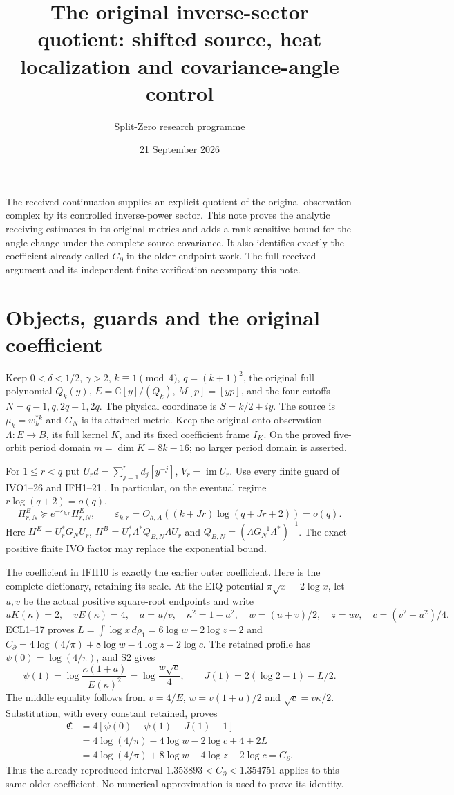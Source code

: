 \documentclass[11pt]{article}
\title{The original inverse-sector quotient: shifted source, heat localization and covariance-angle control}
\author{Split-Zero research programme}\date{21 September 2026}
\begin{document}
\maketitle
The received continuation supplies an explicit quotient of the original
observation complex by its controlled inverse-power sector. This note
proves the analytic receiving estimates in its original metrics and adds
a rank-sensitive bound for the angle change under the complete source
covariance. It also identifies exactly the coefficient already called
$C_\partial$ in the older endpoint work. The full received argument and
its independent finite verification accompany this note.

\section{Objects, guards and the original coefficient}
Keep $0<\delta<1/2$, $\gamma>2$, $k\equiv1\pmod4$,
$q=(k+1)^2$, the original full polynomial $Q_k(y)$,
$E=\mathbb C[y]/(Q_k)$, $M[p]=[yp]$, and the four cutoffs
$N=q-1,q,2q-1,2q$. The physical coordinate is $S=k/2+iy$.
The source is $\mu_k=w_h^{*k}$ and $G_N$ is its attained metric.
Keep the original onto observation $\Lambda:E\to B$, its full kernel
$K$, and its fixed coefficient frame $I_K$. On the proved five-orbit
period domain $m=\dim K=8k-16$; no larger period domain is asserted.

For $1\le r<q$ put $U_rd=\sum_{j=1}^rd_j[y^{-j}]$, $V_r=\operatorname{im}U_r$.
Use every finite guard of IVO1--26 and IFH1--21 \cite{IFH,IVO}.
In particular, on the eventual regime $r\log(q+2)=o(q)$,
\[
H^B_{r,N}\succeq e^{-\varepsilon_{k,r}}H^E_{r,N},\qquad
\varepsilon_{k,r}=O_{h,A}((k+Jr)\log(q+Jr+2))=o(q).
\tag{IQR1}
\]
Here $H^E=U_r^*G_NU_r$, $H^B=U_r^*\Lambda^*Q_{B,N}\Lambda U_r$
and $Q_{B,N}=(\Lambda G_N^{-1}\Lambda^*)^{-1}$.
The exact positive finite IVO factor may replace the exponential bound.

The coefficient in IFH10 is exactly the earlier outer coefficient.
Here is the complete dictionary, retaining its scale.
At the EIQ potential $\pi\sqrt x-2\log x$, let $u,v$ be the actual
positive square-root endpoints and write
\[
uK(\kappa)=2,\quad vE(\kappa)=4,\quad a=u/v,\quad
\kappa^2=1-a^2,\quad w=(u+v)/2,\quad z=uv,\quad c=(v^2-u^2)/4.
\]
ECL1--17 \cite{ECL} proves
$L=\int\log x\,d\rho_1=6\log w-2\log z-2$ and
$C_\partial=4\log(4/\pi)+8\log w-4\log z-2\log c$.
The retained profile has $\psi(0)=\log(4/\pi)$, and S2 gives
\[
\psi(1)=\log\frac{\kappa(1+a)}{E(\kappa)^2}
       =\log\frac{w\sqrt c}{4},\qquad
J(1)=2(\log2-1)-L/2.
\]
The middle equality follows from $v=4/E$, $w=v(1+a)/2$ and
$\sqrt c=v\kappa/2$. Substitution, with every constant retained, proves
\[
\begin{split}
\mathfrak C&=4[\psi(0)-\psi(1)-J(1)-1]\\
 &=4\log(4/\pi)-4\log w-2\log c+4+2L\\
 &=4\log(4/\pi)+8\log w-4\log z-2\log c=C_\partial .
\end{split}\tag{IQR2}
\]
Thus the already reproduced interval
$1.353893<C_\partial<1.354751$ applies to this same older coefficient.
No numerical approximation is used to prove its identity.
\end{document}
